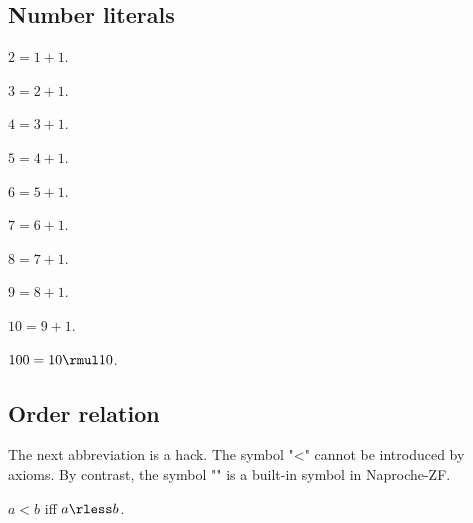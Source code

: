 \subsection{Number literals}

\begin{axiom} \label{def_of_2}
    $2 = 1 + 1$.
\end{axiom}    

\begin{axiom} \label{def_of_3}
     $3 = 2 + 1$.
\end{axiom}    

\begin{axiom} \label{def_of_4}
    $4 = 3 + 1$.
\end{axiom}    

\begin{axiom} \label{def_of_5}
    $5 = 4 + 1$.
\end{axiom}    

\begin{axiom} \label{def_of_6}
    $6 = 5 + 1$.
\end{axiom}    

\begin{axiom} \label{def_of_7}
    $7 = 6 + 1$.
\end{axiom}    

\begin{axiom} \label{def_of_8}
    $8 = 7 + 1$.
\end{axiom}    

\begin{axiom} \label{def_of_9}
    $9 = 8 + 1$.
\end{axiom}    

\begin{axiom} \label{def_of_10}
    $10 = 9 + 1$.
\end{axiom}    

\begin{axiom} \label{def_of_100}
    $100 = 10 \rmul 10$.
\end{axiom}    

\subsection{Order relation}

The next abbreviation is a hack. The symbol "<" cannot be introduced by axioms.
By contrast, the symbol "\rless" is a built-in symbol in Naproche-ZF. 

\begin{abbreviation}\label{real_lt}
    $a < b$ iff $a \rless b$.
\end{abbreviation}


